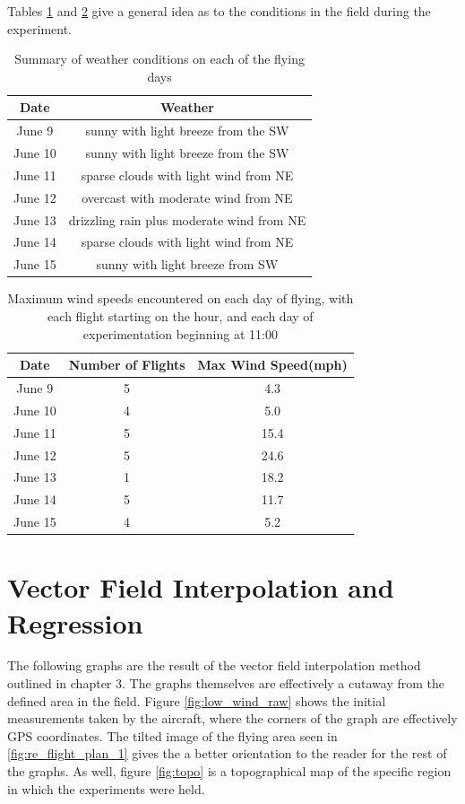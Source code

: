 \documentclass[12pt]{report}
\begin{document}
Tables \ref{table:1} and \ref{table:2} give a general idea as to the conditions in the field during the experiment.
\begin{table}[!ht]
\begin{center}
	\begin{tabular}{|c| c|}
	\hline
	Date&Weather\\	
	\hline
	June 9&sunny with light breeze from the SW\\
	June 10&sunny with light breeze from the SW\\
	June 11&sparse clouds with light wind from NE\\
	June 12&overcast with moderate wind from NE\\
	June 13&drizzling rain plus moderate wind from NE\\
	June 14&sparse clouds with light wind from NE\\
	June 15&sunny with light breeze from SW\\
	\hline	
	\end{tabular}
\end{center}
\caption{Summary of weather conditions on each of the flying days}
\label{table:1}
\end{table}

\begin{table}[!ht]
\begin{center}
	\begin{tabular}{|c| c| c|}
	\hline
	Date&Number of Flights&Max Wind Speed(mph)\\	
	\hline
	June 9&5&4.3\\
	June 10&4&5.0\\
	June 11&5&15.4\\
	June 12&5&24.6\\
	June 13&1&18.2\\
	June 14&5&11.7\\
	June 15&4&5.2\\
	\hline	
	\end{tabular}
\end{center}
\caption{Maximum wind speeds encountered on each day of flying, with each flight starting on the hour, and each day of experimentation beginning at 11:00}
\label{table:2}
\end{table}

\clearpage
\section{Vector Field Interpolation and Regression}
The following graphs are the result of the vector field interpolation method outlined in chapter 3. The graphs themselves are effectively a cutaway from the defined area in the field. Figure \ref{fig:low_wind_raw} shows the initial measurements taken by the aircraft, where the corners of the graph are effectively GPS coordinates. The tilted image of the flying area seen in \ref{fig:re_flight_plan_1} gives the a better orientation to the reader for the rest of the graphs. As well, figure \ref{fig:topo} is a topographical map of the specific region in which the experiments were held. 
\end{document}
